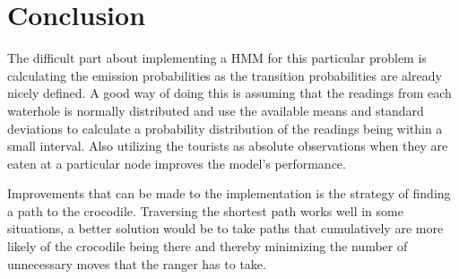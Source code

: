 \documentclass[12pt, a4paper]{article}
\begin{document}
\section{Conclusion}



The difficult part about implementing a HMM for this particular problem is calculating the emission probabilities as the transition probabilities are already nicely defined. A good way of doing this is assuming that the readings from each waterhole is normally distributed and use the available means and standard deviations to calculate a probability distribution of the readings being within a small interval. Also utilizing the tourists as absolute observations when they are eaten at a particular node improves the model's performance.

Improvements that can be made to the implementation is the strategy of finding a path to the crocodile. Traversing the shortest path works well in some situations, a better solution would be to take paths that cumulatively are more likely of the crocodile being there and thereby minimizing the number of unnecessary moves that the ranger has to take.

\raggedright
{}

\end{document}
